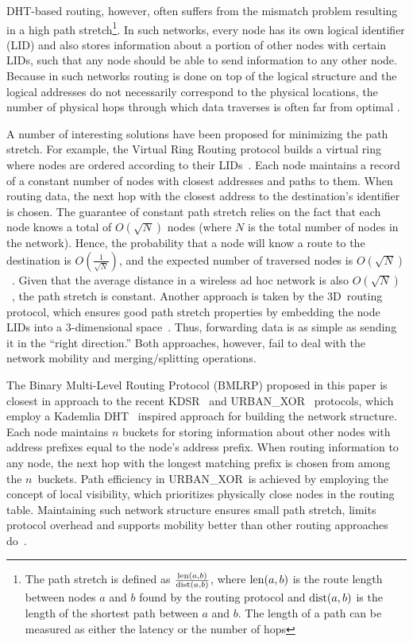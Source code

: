 \documentclass[conference]{IEEEtran}
\theoremstyle{definition}
\newcommand{\urbanxor}{URBAN\_XOR}
\begin{document}
DHT-based routing, however, often suffers from the mismatch problem resulting in a high path stretch\footnote{The path stretch is defined as $ \frac{{\rm len}(a,b)}{{\rm dist}(a,b)} $, where ${\rm len}(a,b)$ is the route length between nodes $a$ and $b$ found by the routing protocol and ${\rm dist}(a,b)$ is the length of the shortest path between $a$ and $b$. The length of a path can be measured as either the latency or the number of hops}. In such networks, every node has its own logical identifier (LID) and also stores information about a portion of other nodes with certain LIDs, such that any node should be able to send information to any other node. Because in such networks routing is done on top of the logical structure and the logical addresses do not necessarily correspond to the physical locations, the number of physical hops through which data traverses is often far from optimal \cite{Abid}.

A number of interesting solutions have been proposed for minimizing the path stretch. For example, the Virtual Ring Routing protocol builds a virtual ring where nodes are ordered according to their LIDs~\cite{VRR}. Each node maintains a record of a constant number of nodes with closest addresses and paths to them. When routing data, the next hop with the closest address to the destination's identifier is chosen. The guarantee of constant path stretch relies on the fact that each node knows a total of $O(\sqrt{N})$ nodes (where $N$ is the total number of nodes in the network). Hence, the probability that a node will know a route to the destination is $O(\frac{1}{\sqrt{N}})$, and the expected number of traversed nodes is $O(\sqrt{N})$~\cite{VRR}. Given that the average distance in a wireless ad hoc network is also $O(\sqrt{N})$~\cite{Kleinrock}, the path stretch is constant. Another approach is taken by the 3D~routing protocol, which ensures good path stretch properties by embedding the node LIDs into a 3-dimensional space~\cite{3drp}. Thus, forwarding data is as simple as sending it in the ``right direction.'' Both approaches, however, fail to deal with the network mobility and merging/splitting operations. 

The Binary Multi-Level Routing Protocol (BMLRP) proposed in this paper is closest in approach to the recent KDSR~\cite{kdsr} and \urbanxor~\cite{Pasquini} protocols, which employ a Kademlia DHT~\cite{kademlia} inspired approach for building the network structure. Each node maintains $n$ buckets for storing information about other nodes with address prefixes equal to the node's address prefix. When routing information to any node, the next hop with the longest matching prefix is chosen from among the $n$~buckets. Path efficiency in \urbanxor~is achieved by employing the concept of local visibility, which prioritizes physically close nodes in the routing table. Maintaining such network structure ensures small path stretch, limits protocol overhead and supports mobility better than other routing approaches do~\cite{urbanxor}.
\end{document}
